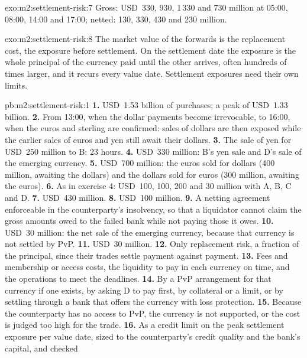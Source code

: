 \begin{solution}{exo:m2:settlement-risk:7}
Gross: USD~330, 930, 1\,330 and 730 million at 05:00, 08:00, 14:00 and 17:00;
netted: 130, 330, 430 and 230 million.
\end{solution}

\begin{solution}{exo:m2:settlement-risk:8}
The market value of the forwards is the replacement cost, the exposure before
settlement. On the settlement date the exposure is the whole principal of the
currency paid until the other arrives, often hundreds of times larger, and it
recurs every value date. Settlement exposures need their own limits.
\end{solution}

\begin{solution}{pb:m2:settlement-risk:1}
\textbf{1.} USD~1.53 billion of purchases; a peak of USD~1.33 billion.
\textbf{2.} From 13:00, when the dollar payments become irrevocable, to 16:00, when
the euros and sterling are confirmed: sales of dollars are then exposed while the
earlier sales of euros and yen still await their dollars.
\textbf{3.} The sale of yen for USD~250 million to B: 23 hours.
\textbf{4.} USD~330 million: B's yen sale and D's sale of the emerging currency.
\textbf{5.} USD~700 million: the euros sold for dollars (400 million, awaiting the
dollars) and the dollars sold for euros (300 million, awaiting the euros).
\textbf{6.} As in exercise 4: USD~100, 100, 200 and 30 million with A, B, C and D.
\textbf{7.} USD~430 million.
\textbf{8.} USD~100 million.
\textbf{9.} A netting agreement enforceable in the counterparty's insolvency, so
that a liquidator cannot claim the gross amounts owed to the failed bank while not
paying those it owes.
\textbf{10.} USD~30 million: the net sale of the emerging currency, because that
currency is not settled by PvP.
\textbf{11.} USD~30 million.
\textbf{12.} Only replacement risk, a fraction of the principal, since their trades
settle payment against payment.
\textbf{13.} Fees and membership or access costs, the liquidity to pay in each
currency on time, and the operations to meet the deadlines.
\textbf{14.} By a PvP arrangement for that currency if one exists, by asking D to pay
first, by collateral or a limit, or by settling through a bank that offers the
currency with loss protection.
\textbf{15.} Because the counterparty has no access to PvP, the currency is not
supported, or the cost is judged too high for the trade.
\textbf{16.} As a credit limit on the peak settlement exposure per value date,
sized to the counterparty's credit quality and the bank's capital, and checked

\end{solution}
